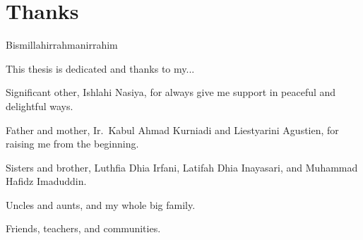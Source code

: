 
\begingroup
\let\clearpage\relax
\let\cleardoublepage\relax

\chapter*{Thanks}
\label{chap:thanks}

Bismillahirrahmanirrahim

\noindent This thesis is dedicated and thanks to my...

\noindent Significant other, Ishlahi Nasiya, for always give me support in peaceful and delightful ways.

\noindent Father and mother, Ir.\ Kabul Ahmad Kurniadi and Liestyarini Agustien, for raising me from the beginning.

\noindent Sisters and brother, Luthfia Dhia Irfani, Latifah Dhia Inayasari, and Muhammad Hafidz Imaduddin.

\noindent Uncles and aunts, and my whole big family.

\noindent Friends, teachers, and communities.

\endgroup

